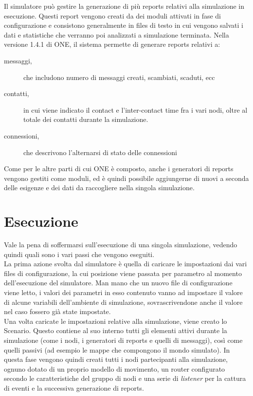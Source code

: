 Il simulatore può gestire la generazione di più reports relativi alla simulazione in esecuzione. Questi report vengono creati da dei moduli attivati in fase di configurazione e consistono generalmente in files di testo in cui vengono salvati i dati e statistiche che verranno poi analizzati a simulazione terminata. Nella versione 1.4.1 di ONE, il sistema permette di generare reports relativi a:
\begin{description}
\item[messaggi,] che includono numero di messaggi creati, scambiati, scaduti, ecc
\item[contatti,] in cui viene indicato il contact e l'inter-contact time fra i vari nodi, oltre al totale dei contatti durante la simulazione.
\item[connessioni,] che descrivono l'alternarsi di stato delle connessioni 
\end{description}

Come per le altre parti di cui ONE è composto, anche i generatori di reports vengono gestiti come moduli, ed è quindi possibile aggiungerne di nuovi a seconda delle esigenze e dei dati da raccogliere nella singola simulazione.


\section{Esecuzione}
\label{esecuzioneONE}
Vale la pena di soffermarsi sull'esecuzione di una singola simulazione, vedendo quindi quali sono i vari passi che vengono eseguiti.
\\

La prima azione svolta dal simulatore è quella di caricare le impostazioni dai vari files di configurazione, la cui posizione viene passata per parametro al momento dell'esecuzione del simulatore. Man mano che un nuovo file di configurazione viene letto, i valori dei parametri in esso contenuto vanno ad impostare il valore di alcune variabili dell'ambiente di simulazione, sovrascrivendone anche il valore nel caso fossero già state impostate.
\\

Una volta caricate le impostazioni relative alla simulazione, viene creato lo Scenario. Questo contiene al suo interno tutti gli elementi attivi durante la simulazione (come i nodi, i generatori di reports e quelli di messaggi), così come quelli passivi (ad esempio le mappe che compongono il mondo simulato). In questa fase vengono quindi creati tutti i nodi partecipanti alla simulazione, ognuno dotato di un proprio modello di movimento, un router configurato secondo le caratteristiche del gruppo di nodi e una serie di \textit{listener} per la cattura di eventi e la successiva generazione di reports.
\\

